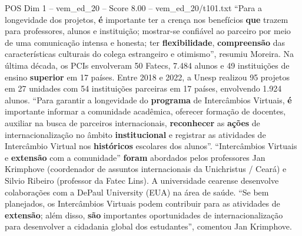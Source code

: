 \begin{textsample}{POS Dim 1 – vem\_ed\_20 – Score 8.00 – vem\_ed\_20/t101.txt}  \label{ex:f1_pos_110}
“Para a longevidade dos projetos, \textbf{é} importante ter a crença nos benefícios \textbf{que} trazem para professores, alunos e instituição; mostrar-se confiável ao parceiro por meio de uma comunicação intensa e honesta; ter \textbf{flexibilidade}, \textbf{compreensão} das características culturais do colega estrangeiro e otimismo”, resumiu Moreira.
Na última década, os PCIs envolveram 50 Fatecs, 7.484 alunos e 49 instituições de ensino \textbf{superior} em 17 países.
Entre 2018 e 2022, a Unesp realizou 95 projetos em 27 unidades com 54 instituições parceiras em 17 países, envolvendo 1.924 alunos. “Para garantir a longevidade do \textbf{programa} de Intercâmbios Virtuais, \textbf{é} importante informar a comunidade acadêmica, oferecer formação de docentes, auxiliar na busca de parceiros internacionais, \textbf{reconhecer} as \textbf{ações} de internacionalização no âmbito \textbf{institucional} e registrar as atividades de Intercâmbio Virtual nos \textbf{históricos} escolares dos alunos”. “Intercâmbios Virtuais e \textbf{extensão} com a comunidade” \textbf{foram} abordados pelos professores Jan Krimphove (coordenador de assuntos internacionais da Unichristus / Ceará) e Silvio Ribeiro (professor da Fatec Lins).
A universidade cearense desenvolve colaborações com a DePaul University (EUA) na área de saúde. “Se bem planejados, os Intercâmbios Virtuais podem contribuir para as atividades de \textbf{extensão}; além disso, \textbf{são} importantes oportunidades de internacionalização para desenvolver a cidadania global dos estudantes”, comentou Jan Krimphove.

\end{textsample}
